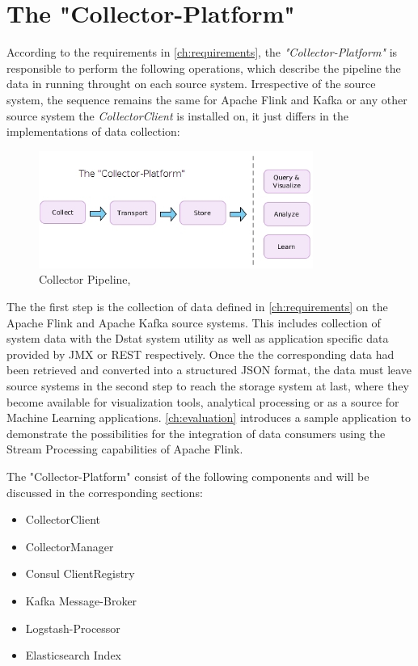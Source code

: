 \section{The "Collector-Platform"}

According to the requirements in \autoref{ch:requirements}, the \textit{"Collector-Platform"} is responsible to perform the
following operations, which describe the pipeline the data in running throught on each source system. Irrespective of the source system,
the sequence remains the same for Apache Flink and Kafka or any other source system the \textit{CollectorClient} is installed on,
it just differs in the implementations of data collection:

\begin{figure}[H]
	\centering
	\includegraphics[width=0.8\textwidth]{../images/06-collect-pipeline.jpg}
	\caption{Collector Pipeline, \cite{VanL14}}
	\label{fig:colletor-pipeline}
\end{figure}

The the first step is the collection of data defined in \autoref{ch:requirements} on the Apache Flink and Apache Kafka source
systems. This includes collection of system data with the Dstat system utility as well as application specific data provided
by JMX or REST respectively. Once the the corresponding data had been retrieved and converted into a structured JSON format,
the data must leave source systems in the second step to reach the storage system at last, where they become available for
visualization tools, analytical processing or as a source for Machine Learning applications. \autoref{ch:evaluation} introduces
a sample application to demonstrate the possibilities for the integration of data consumers using the Stream Processing capabilities
of Apache Flink.

The "Collector-Platform" consist of the following components and will be discussed in the corresponding sections:

\begin{itemize}
    \item CollectorClient
    \item CollectorManager
    \item Consul ClientRegistry
    \item Kafka Message-Broker
    \item Logstash-Processor
    \item Elasticsearch Index
\end{itemize}

